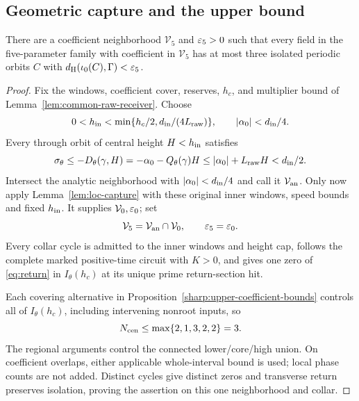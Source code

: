 \subsection{Geometric capture and the upper bound}
\begin{proposition}\label{prop:central-bound}
There are a coefficient neighborhood \(\mathcal V_5\) and
\(\varepsilon_5>0\) such that every field in the five-parameter family with
coefficient in \(\mathcal V_5\) has at most three isolated periodic
orbits \(C\) with \(d_{\rm H}(\iota_0(C),\Gamma)<\varepsilon_5\).
\end{proposition}
\begin{proof}
Fix the windows, coefficient cover, reserves, \(h_c\), and multiplier
bound of Lemma~\ref{lem:common-raw-receiver}. Choose
\[
 0<h_{\rm in}<\min\{h_c/2,d_{\rm in}/(4L_{\rm raw})\},
 \qquad |\alpha_0|<d_{\rm in}/4.
\]
Every through orbit of central height \(H<h_{\rm in}\) satisfies
\begin{equation}\label{eq:height-capture}
 \sigma_\theta\le-D_\theta(\gamma,H)
 =-\alpha_0-Q_\theta(\gamma)H
 \le|\alpha_0|+L_{\rm raw}H<d_{\rm in}/2.
\end{equation}
Intersect the analytic neighborhood with \(|\alpha_0|<d_{\rm in}/4\)
and call it \(\mathcal V_{\rm an}\).
Only now apply Lemma~\ref{lem:loc-capture} with these original inner
windows, speed bounds and fixed \(h_{\rm in}\). It supplies
\(\mathcal V_0,\varepsilon_0\); set
\[
 \mathcal V_5=\mathcal V_{\rm an}\cap\mathcal V_0,
 \qquad \varepsilon_5=\varepsilon_0.
\]
Every collar cycle is admitted to the inner windows and height cap,
follows the complete marked positive-time circuit with \(K>0\), and
gives one zero of \eqref{eq:return} in \(I_\theta(h_c)\) at its unique
prime return-section hit.

Each covering alternative in Proposition~\ref{sharp:upper-coefficient-bounds}
controls all of \(I_\theta(h_c)\), including intervening nonroot inputs, so
\begin{equation}\label{eq:total-bound}
 N_{\rm cen}\le\max\{2,1,3,2,2\}=3.
\end{equation}
The regional arguments control the connected lower/core/high union.
On coefficient overlaps, either applicable whole-interval bound is used;
local phase counts are not added. Distinct cycles give
distinct zeros and transverse return preserves isolation, proving the
assertion on this one neighborhood and collar.
\end{proof}

